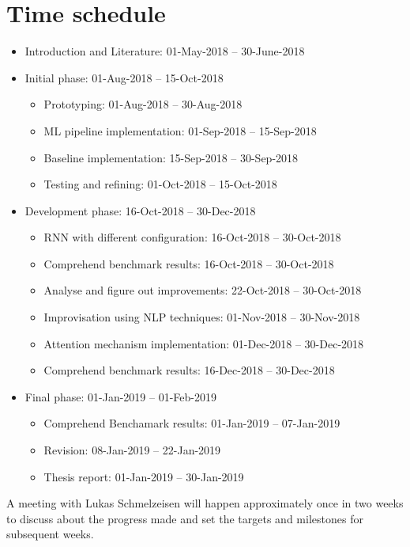 \documentclass[a4paper, 11pt]{article}
\begin{document}

\section{Time schedule}

\begin{itemize}
	\item Introduction and Literature: 01-May-2018 – 30-June-2018
	\item Initial phase: 01-Aug-2018 – 15-Oct-2018
	\begin{itemize}
		\item Prototyping: 01-Aug-2018 – 30-Aug-2018
		\item ML pipeline implementation: 01-Sep-2018 – 15-Sep-2018
        \item Baseline implementation: 15-Sep-2018 – 30-Sep-2018
        \item Testing and refining: 01-Oct-2018 – 15-Oct-2018
	\end{itemize}
	\item Development phase: 16-Oct-2018 – 30-Dec-2018
	\begin{itemize}
		\item RNN with different configuration: 16-Oct-2018 – 30-Oct-2018
		\item Comprehend benchmark results: 16-Oct-2018 – 30-Oct-2018
		\item Analyse and figure out improvements: 22-Oct-2018 – 30-Oct-2018
        \item Improvisation using NLP techniques: 01-Nov-2018 – 30-Nov-2018
        \item Attention mechanism implementation: 01-Dec-2018 – 30-Dec-2018
        \item Comprehend benchmark results: 16-Dec-2018 – 30-Dec-2018
	\end{itemize}
	\item Final phase: 01-Jan-2019 – 01-Feb-2019
	\begin{itemize}
	 	\item Comprehend Benchamark results: 01-Jan-2019 – 07-Jan-2019
		\item Revision: 08-Jan-2019 – 22-Jan-2019
		\item Thesis report: 01-Jan-2019 – 30-Jan-2019
	\end{itemize}
\end{itemize}

A meeting with Lukas Schmelzeisen will happen approximately once in two weeks to discuss about the progress made and set the targets and milestones for subsequent weeks. 
\end{document}
